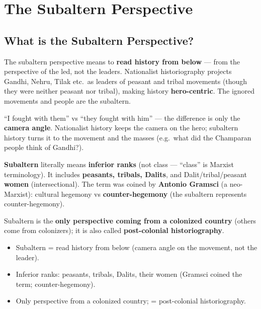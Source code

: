 \chapter{The Subaltern Perspective}

\section{What is the Subaltern Perspective?}

The subaltern perspective means to \textbf{read history from below} --- from the perspective of the led, not the leaders. Nationalist historiography projects Gandhi, Nehru, Tilak etc.\ as leaders of peasant and tribal movements (though they were neither peasant nor tribal), making history \textbf{hero-centric}. The ignored movements and people are the subaltern.

\begin{ExampleBox}
``I fought with them'' vs ``they fought with him'' --- the difference is only the \textbf{camera angle}. Nationalist history keeps the camera on the hero; subaltern history turns it to the movement and the masses (e.g.\ what did the Champaran people think of Gandhi?).
\end{ExampleBox}

\begin{KeyConcept}
\textbf{Subaltern} literally means \textbf{inferior ranks} (not class --- ``class'' is Marxist terminology). It includes \textbf{peasants, tribals, Dalits}, and Dalit/tribal/peasant \textbf{women} (intersectional). The term was coined by \textbf{Antonio Gramsci} (a neo-Marxist): cultural hegemony vs \textbf{counter-hegemony} (the subaltern represents counter-hegemony).
\end{KeyConcept}

\begin{DataFact}
Subaltern is the \textbf{only perspective coming from a colonized country} (others come from colonizers); it is also called \textbf{post-colonial historiography}.
\end{DataFact}

\begin{QuickRevision}
\begin{itemize}
\item Subaltern = read history from below (camera angle on the movement, not the leader).
\item Inferior ranks: peasants, tribals, Dalits, their women (Gramsci coined the term; counter-hegemony).
\item Only perspective from a colonized country; = post-colonial historiography.
\end{itemize}
\end{QuickRevision}

